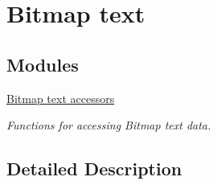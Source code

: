 \hypertarget{group____bmptext}{\section{Bitmap text}
\label{group____bmptext}
}
\subsection*{Modules}
\begin{DoxyCompactItemize}
\item 
\hyperlink{group____accessors__bmptext}{Bitmap text accessors}
\begin{DoxyCompactList}\small\item\em Functions for accessing Bitmap text data. \end{DoxyCompactList}\end{DoxyCompactItemize}


\subsection{Detailed Description}
